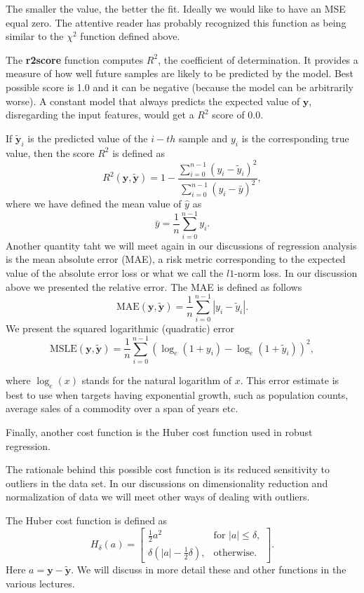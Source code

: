 \documentclass[%
oneside,                 %
final,                   %
10pt]{article}
\begin{document}
The smaller the value, the better the fit. Ideally we would like to
have an MSE equal zero.  The attentive reader has probably recognized
this function as being similar to the $\chi^2$ function defined above.

The \textbf{r2score} function computes $R^2$, the coefficient of
determination. It provides a measure of how well future samples are
likely to be predicted by the model. Best possible score is 1.0 and it
can be negative (because the model can be arbitrarily worse). A
constant model that always predicts the expected value of $\bm{y}$,
disregarding the input features, would get a $R^2$ score of $0.0$.

If $\tilde{\bm{y}}_i$ is the predicted value of the $i-th$ sample and $y_i$ is the corresponding true value, then the score $R^2$ is defined as
\[
R^2(\bm{y}, \tilde{\bm{y}}) = 1 - \frac{\sum_{i=0}^{n - 1} (y_i - \tilde{y}_i)^2}{\sum_{i=0}^{n - 1} (y_i - \bar{y})^2},
\]
where we have defined the mean value  of $\hat{y}$ as
\[
\bar{y} =  \frac{1}{n} \sum_{i=0}^{n - 1} y_i.
\]
Another quantity taht we will meet again in our discussions of regression analysis is 
 the mean absolute error (MAE), a risk metric corresponding to the expected value of the absolute error loss or what we call the $l1$-norm loss. In our discussion above we presented the relative error.
The MAE is defined as follows
\[
\text{MAE}(\bm{y}, \bm{\tilde{y}}) = \frac{1}{n} \sum_{i=0}^{n-1} \left| y_i - \tilde{y}_i \right|.
\]
We present the 
squared logarithmic (quadratic) error
\[
\text{MSLE}(\bm{y}, \bm{\tilde{y}}) = \frac{1}{n} \sum_{i=0}^{n - 1} (\log_e (1 + y_i) - \log_e (1 + \tilde{y}_i) )^2,
\]

where $\log_e (x)$ stands for the natural logarithm of $x$. This error
estimate is best to use when targets having exponential growth, such
as population counts, average sales of a commodity over a span of
years etc. 


Finally, another cost function is the Huber cost function used in robust regression.

The rationale behind this possible cost function is its reduced
sensitivity to outliers in the data set. In our discussions on
dimensionality reduction and normalization of data we will meet other
ways of dealing with outliers.

The Huber cost function is defined as
\[
H_{\delta}(a)=\begin{bmatrix}\frac{1}{2}a^{2}& \text{for }|a|\leq \delta ,\\ \delta (|a|-{\frac {1}{2}}\delta ),&\text{otherwise.}\end{bmatrix}.
\]
Here $a=\bm{y} - \bm{\tilde{y}}$.
We will discuss in more
detail these and other functions in the various lectures.
\end{document}
